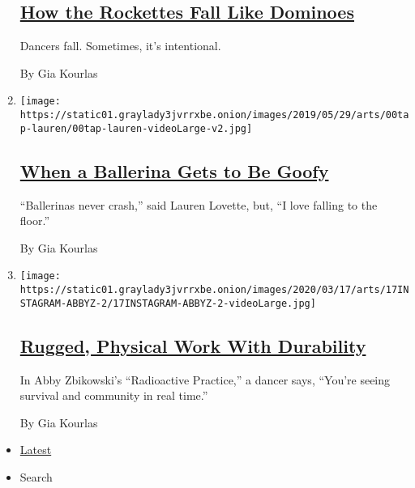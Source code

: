 \begin{enumerate}
{  \subsection{\texorpdfstring{\href{/interactive/2019/05/30/arts/dance/speaking-in-dance-rockettes.html}{How
  the Rockettes Fall Like
  Dominoes}}{How the Rockettes Fall Like Dominoes}}\label{how-the-rockettes-fall-like-dominoes}}

  Dancers fall. Sometimes, it's intentional.

  By Gia Kourlas
\item
  \texttt{[image: https://static01.graylady3jvrrxbe.onion/images/2019/05/29/arts/00tap-lauren/00tap-lauren-videoLarge-v2.jpg]}

  \hypertarget{when-a-ballerina-gets-to-be-goofy}{%
  \subsection{\texorpdfstring{\href{/interactive/2019/05/30/arts/dance/speaking-in-dance-lauren-lovette.html}{When
  a Ballerina Gets to Be
  Goofy}}{When a Ballerina Gets to Be Goofy}}\label{when-a-ballerina-gets-to-be-goofy}}

  ``Ballerinas never crash,'' said Lauren Lovette, but, ``I love falling
  to the floor.''

  By Gia Kourlas
\item
  \texttt{[image: https://static01.graylady3jvrrxbe.onion/images/2020/03/17/arts/17INSTAGRAM-ABBYZ-2/17INSTAGRAM-ABBYZ-2-videoLarge.jpg]}

  \hypertarget{rugged-physical-work-with-durability}{%
  \subsection{\texorpdfstring{\href{/2020/03/19/arts/dance/abby-zbikowski-radioactive-practice.html}{Rugged,
  Physical Work With
  Durability}}{Rugged, Physical Work With Durability}}\label{rugged-physical-work-with-durability}}

  In Abby Zbikowski's ``Radioactive Practice,'' a dancer says, ``You're
  seeing survival and community in real time.''

  By Gia Kourlas
\end{enumerate}

\begin{itemize}
\tightlist
\item
  \protect\hyperlink{stream-panel}{Latest}
\item
  Search
\end{itemize}

